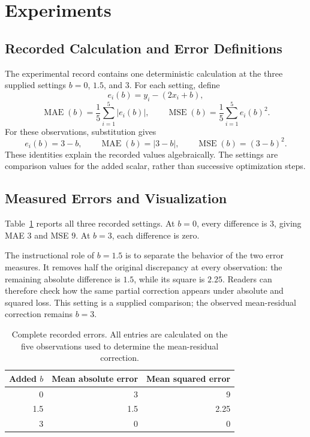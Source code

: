 \documentclass[11pt]{article}
\begin{document}
\section{Experiments}

\subsection{Recorded Calculation and Error Definitions}

The experimental record contains one deterministic calculation at the three supplied settings $b=0$, $1.5$, and $3$. For each setting, define
\[
e_i(b)=y_i-(2x_i+b),
\]
\[
\operatorname{MAE}(b)=\frac{1}{5}\sum_{i=1}^{5}|e_i(b)|,
\qquad
\operatorname{MSE}(b)=\frac{1}{5}\sum_{i=1}^{5}e_i(b)^2.
\]
For these observations, substitution gives
\[
e_i(b)=3-b,\qquad
\operatorname{MAE}(b)=|3-b|,\qquad
\operatorname{MSE}(b)=(3-b)^2.
\]
These identities explain the recorded values algebraically. The settings are comparison values for the added scalar, rather than successive optimization steps.

\subsection{Measured Errors and Visualization}

Table~\ref{tab:recorded_errors} reports all three recorded settings. At $b=0$, every difference is $3$, giving MAE $3$ and MSE $9$. At $b=3$, each difference is zero.

The instructional role of $b=1.5$ is to separate the behavior of the two error measures. It removes half the original discrepancy at every observation: the remaining absolute difference is $1.5$, while its square is $2.25$. Readers can therefore check how the same partial correction appears under absolute and squared loss. This setting is a supplied comparison; the observed mean-residual correction remains $b=3$.

\begin{table}[tbp]
\centering
\caption{Complete recorded errors. All entries are calculated on the five observations used to determine the mean-residual correction.}
\label{tab:recorded_errors}
\begin{tabular}{rrr}
\toprule
Added $b$ & Mean absolute error & Mean squared error \\
\midrule
0   & 3   & 9    \\
1.5 & 1.5 & 2.25 \\
3   & 0   & 0    \\
\bottomrule
\end{tabular}
\end{table}
\end{document}
